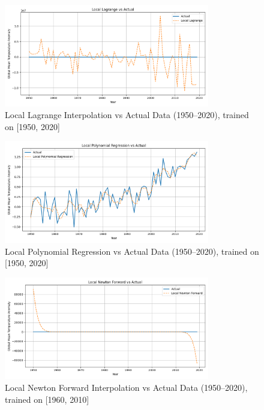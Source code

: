 \begin{figure}[htbp]
    \centering
    \includegraphics[width=0.8\textwidth]{../figs/Local_Lagrange_vs_actual[1950, 2020, 1].png}
    \caption{Local Lagrange Interpolation vs Actual Data (1950--2020), trained on [1950, 2020]}
    \label{fig:lagrange}
\end{figure}

\begin{figure}[htbp]
    \centering
    \includegraphics[width=0.8\textwidth]{../figs/Local_Polynomial_Regression_vs_actual[1950, 2020, 1].png}
    \caption{Local Polynomial Regression vs Actual Data (1950--2020), trained on [1950, 2020]}
    \label{fig:regression}
\end{figure}

\begin{figure}[htbp]
    \centering
    \includegraphics[width=0.8\textwidth]{../figs/Local_Newton_Forward_vs_actual[1960, 2010, 1].png}
    \caption{Local Newton Forward Interpolation vs Actual Data (1950--2020), trained on [1960, 2010]}
    \label{fig:forward2}
\end{figure}

